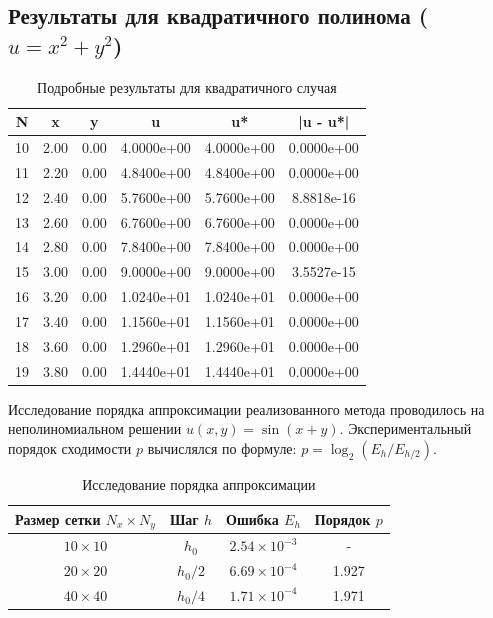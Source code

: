 \documentclass[a4paper,12pt]{article}
\begin{document}
\subsection{Результаты для квадратичного полинома ($u = x^2 + y^2$)}
\begin{table}[H]
    \centering
    \begin{tabular}{|c|c|c|c|c|c|}
        \hline
        N & x & y & u & u* & |u - u*| \\
        \hline
        10	& 2.00 & 0.00 & 4.0000e+00 & 4.0000e+00 & 0.0000e+00 \\
        11	& 2.20 & 0.00 & 4.8400e+00 & 4.8400e+00 & 0.0000e+00 \\
        12	& 2.40 & 0.00 & 5.7600e+00 & 5.7600e+00 & 8.8818e-16 \\
        13	& 2.60 & 0.00 & 6.7600e+00 & 6.7600e+00 & 0.0000e+00 \\
        14	& 2.80 & 0.00 & 7.8400e+00 & 7.8400e+00 & 0.0000e+00 \\
        15	& 3.00 & 0.00 & 9.0000e+00 & 9.0000e+00 & 3.5527e-15 \\
        16	& 3.20 & 0.00 & 1.0240e+01 & 1.0240e+01 & 0.0000e+00 \\
        17	& 3.40 & 0.00 & 1.1560e+01 & 1.1560e+01 & 0.0000e+00 \\
        18	& 3.60 & 0.00 & 1.2960e+01 & 1.2960e+01 & 0.0000e+00 \\
        19	& 3.80 & 0.00 & 1.4440e+01 & 1.4440e+01 & 0.0000e+00 \\
        \hline
    \end{tabular}
    \caption{Подробные результаты для квадратичного случая}
\end{table}

Исследование порядка аппроксимации реализованного метода проводилось на неполиномиальном решении $u(x,y) = \sin(x+y)$. Экспериментальный порядок сходимости $p$ вычислялся по формуле: $p = \log_2 (E_h / E_{h/2})$.

\begin{table}[H]
    \centering
    \caption{Исследование порядка аппроксимации}
    \label{tab:order}
    \begin{tabular}{|c|c|c|c|}
        \hline
        \textbf{Размер сетки $N_x \times N_y$} & \textbf{Шаг $h$} & \textbf{Ошибка $E_h$} & \textbf{Порядок $p$} \\
        \hline
        $10 \times 10$ & $h_0$ & $2.54 \times 10^{-3}$ & - \\
        \hline
        $20 \times 20$ & $h_0 / 2$ & $6.69 \times 10^{-4}$ & 1.927 \\
        \hline
        $40 \times 40$ & $h_0 / 4$ & $1.71 \times 10^{-4}$ & 1.971 \\
        \hline
    \end{tabular}
\end{table}
\end{document}
